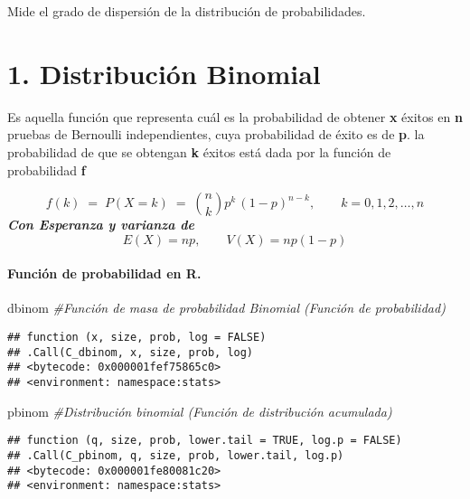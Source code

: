 \documentclass[
]{article}
\newenvironment{Shaded}{\begin{snugshade}}{\end{snugshade}}
\newcommand{\CommentTok}[1]{\textcolor[rgb]{0.56,0.35,0.01}{\textit{#1}}}
\newcommand{\NormalTok}[1]{#1}
\begin{document}
\pagebreak

Mide el grado de dispersión de la distribución de probabilidades.

\hypertarget{distribuciuxf3n-binomial}{%
\section{1. Distribución Binomial}\label{distribuciuxf3n-binomial}}

Es aquella función que representa cuál es la probabilidad de obtener
\textbf{x} éxitos en \textbf{n} pruebas de Bernoulli independientes,
cuya probabilidad de éxito es de \textbf{p}. \pagebreak la probabilidad
de que se obtengan \textbf{k} éxitos está dada por la función de
probabilidad \textbf{f}

\[f(k) \;=\; P(X=k)  \;=\; {n\choose k} p^k\, (1-p)^{n-k}, \qquad k=0,1,2, \ldots, n\]
\textbf{\emph{Con Esperanza y varianza de}}
\[E(X)= np, \qquad V(X)= np(1-p)\]

\hypertarget{funciuxf3n-de-probabilidad-en-r.}{%
\paragraph{Función de probabilidad en
R.}\label{funciuxf3n-de-probabilidad-en-r.}}

\begin{Shaded}
\begin{Highlighting}[]
\NormalTok{dbinom }\CommentTok{\#Función de masa de probabilidad Binomial (Función de probabilidad)}
\end{Highlighting}
\end{Shaded}

\begin{verbatim}
## function (x, size, prob, log = FALSE) 
## .Call(C_dbinom, x, size, prob, log)
## <bytecode: 0x000001fef75865c0>
## <environment: namespace:stats>
\end{verbatim}

\begin{Shaded}
\begin{Highlighting}[]
\NormalTok{pbinom }\CommentTok{\#Distribución binomial (Función de distribución acumulada)}
\end{Highlighting}
\end{Shaded}

\begin{verbatim}
## function (q, size, prob, lower.tail = TRUE, log.p = FALSE) 
## .Call(C_pbinom, q, size, prob, lower.tail, log.p)
## <bytecode: 0x000001fe80081c20>
## <environment: namespace:stats>
\end{verbatim}
\end{document}
